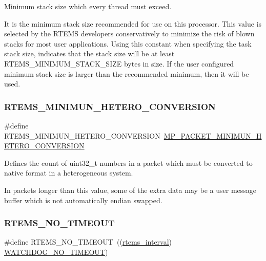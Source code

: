 Minimum stack size which every thread must exceed. 

It is the minimum stack size recommended for use on this processor. This value is selected by the R\+T\+E\+MS developers conservatively to minimize the risk of blown stacks for most user applications. Using this constant when specifying the task stack size, indicates that the stack size will be at least R\+T\+E\+M\+S\+\_\+\+M\+I\+N\+I\+M\+U\+M\+\_\+\+S\+T\+A\+C\+K\+\_\+\+S\+I\+ZE bytes in size. If the user configured minimum stack size is larger than the recommended minimum, then it will be used. \mbox{\label{group__RTEMSAPIClassic_ga9c3131af02cd6bf59c91d77b23e0e418}} 
\subsubsection{\texorpdfstring{RTEMS\_MINIMUN\_HETERO\_CONVERSION}{RTEMS\_MINIMUN\_HETERO\_CONVERSION}}
{\footnotesize\ttfamily \#define R\+T\+E\+M\+S\+\_\+\+M\+I\+N\+I\+M\+U\+N\+\_\+\+H\+E\+T\+E\+R\+O\+\_\+\+C\+O\+N\+V\+E\+R\+S\+I\+ON~\mbox{\hyperlink{group__RTEMSScoreMPPacket_ga100bacab2178ec9d2d157920a10a9d4f}{M\+P\+\_\+\+P\+A\+C\+K\+E\+T\+\_\+\+M\+I\+N\+I\+M\+U\+N\+\_\+\+H\+E\+T\+E\+R\+O\+\_\+\+C\+O\+N\+V\+E\+R\+S\+I\+ON}}}



Defines the count of {\ttfamily uint32\+\_\+t} numbers in a packet which must be converted to native format in a heterogeneous system. 

In packets longer than this value, some of the extra data may be a user message buffer which is not automatically endian swapped. \mbox{\label{group__RTEMSAPIClassic_ga4b2775cd075d4046bf637ae802689476}} 
\subsubsection{\texorpdfstring{RTEMS\_NO\_TIMEOUT}{RTEMS\_NO\_TIMEOUT}}
{\footnotesize\ttfamily \#define R\+T\+E\+M\+S\+\_\+\+N\+O\+\_\+\+T\+I\+M\+E\+O\+UT~((\mbox{\hyperlink{group__ClassicTasks_gad39c43f949683d46874e3a5586b93aee}{rtems\+\_\+interval}}) \mbox{\hyperlink{group__RTEMSScoreWatchdog_gaa7a11d3dcb3ba512032421888d16b327}{W\+A\+T\+C\+H\+D\+O\+G\+\_\+\+N\+O\+\_\+\+T\+I\+M\+E\+O\+UT}})}




